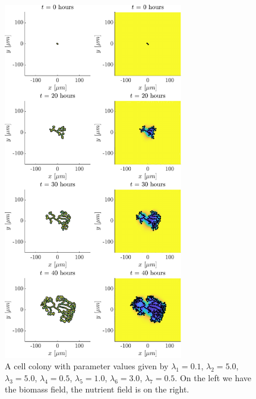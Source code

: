 \begin{figure}[!htb] %
    \centering
    \includegraphics[width= 0.7\textwidth]{
        chapter3/figures/t_all_L1_0o10_L2_5o00_L3_5o00_L4_0o50_L5_1o00_L6_3o00_L7_0o50.pdf}
    \caption{A cell colony with parameter values given by
             $\lambda_1 = 0.1$,  
             $\lambda_2 = 5.0$, 
             $\lambda_3 = 5.0$, 
             $\lambda_4 = 0.5$, 
             $\lambda_5 = 1.0$, 
             $\lambda_6 = 3.0$, 
             $\lambda_7 = 0.5$. 
             On the left we have the biomass field, the nutrient field is on the right.}
    \label{fig:colony1}
\end{figure}

